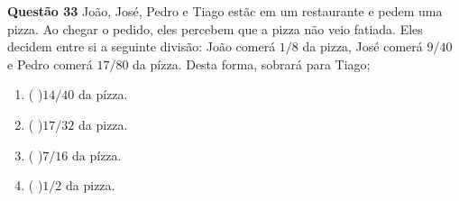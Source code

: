 {\bf Questão 33} 
João, José, Pedro e Tiago estãc em um restaurante e pedem uma pizza. Ao chegar o pedido, eles percebem
que a pizza não veio fatiada. Eles decidem entre si a seguinte divisão: João comerá $1/8$ da pizza, José comerá $9/40$
e Pedro comerá $17/80$ da pízza. Desta forma, sobrará para Tiago;
\begin{multicols}{2}
\begin{enumerate}
		\item ( )$ 14/40$ da pízza.
		\item ( )$ 17/32$ da pizza.
		\item ( )$ 7/16$ da pízza.
		\item ( )$ 1/2$ da pizza.
\end{enumerate}
\end{multicols}
